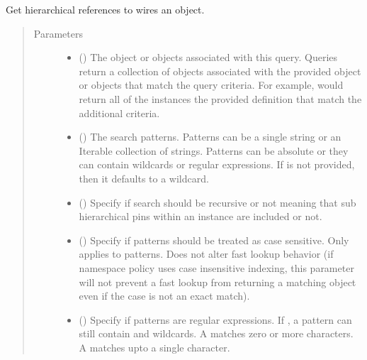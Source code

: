 \documentclass[letterpaper,10pt,english,openany,oneside]{sphinxmanual}
\begin{document}
\begin{fulllineitems}
\label{\detokenize{reference/classes/generated/spydrnet.get_hpins:spydrnet.get_hpins}}
Get hierarchical references to wires  an object.
\begin{quote}\begin{description}
\item[{Parameters}] \leavevmode\begin{itemize}
\item {} 
 () \textendash{} The object or objects associated with this query. Queries return a collection of objects associated with the
provided object or objects that match the query criteria. For example,  would
return all of the instances  the provided definition that match the additional criteria.

\item {} 
 () \textendash{} The search patterns. Patterns can be a single string or an Iterable collection of strings. Patterns can be
absolute or they can contain wildcards or regular expressions. If  is not provided, then it defaults
to a wildcard.

\item {} 
 () \textendash{} Specify if search should be recursive or not meaning that sub hierarchical pins within an instance are
included or not.

\item {} 
 () \textendash{} Specify if patterns should be treated as case sensitive. Only applies to patterns. Does not alter fast lookup
behavior (if namespace policy uses case insensitive indexing, this parameter will not prevent a fast lookup
from returning a matching object even if the case is not an exact match).

\item {} 
 () \textendash{} Specify if patterns are regular expressions. If , a pattern can still contain \sphinxtitleref{*} and  wildcards. A
\sphinxtitleref{*} matches zero or more characters. A  matches upto a single character.


\end{itemize}
\end{description}
\end{quote}
\end{fulllineitems}
\end{document}
